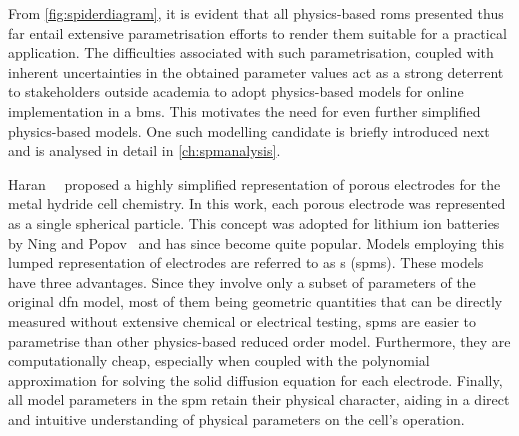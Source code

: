 From \cref{fig:spiderdiagram}, it is evident  that all physics-based \glspl{rom}
presented thus far entail extensive  parametrisation efforts   to  render
them  suitable for  a practical  application. The  difficulties associated  with
such  parametrisation,  coupled  with  inherent uncertainties  in  the  obtained
parameter values act  as a strong deterrent to stakeholders  outside academia to
adopt  physics-based  models for  online  implementation  in a  \gls{bms}.  This
motivates the  need for even  further simplified physics-based models.  One such
modelling  candidate  is briefly  introduced  next  and  is analysed  in  detail
in \cref{ch:spmanalysis}.


Haran~\etal{}~\cite{Haran1998}  proposed a  highly simplified  representation of
porous  electrodes for  the metal  hydride cell  chemistry. In  this work,  each
porous electrode  was represented as  a single spherical particle.  This concept
was adopted for lithium ion batteries  by Ning and Popov~\cite{Ning2004} and has
since  become quite  popular.  Models employing  this  lumped representation  of
electrodes are referred to as  s (\gls{spm}s). These models have
three advantages. Since they involve only a subset of parameters of the original
\gls{dfn} model,  most of them being  geometric quantities that can  be directly
measured  without  extensive chemical  or  electrical  testing, \glspl{spm}  are
easier to parametrise than other physics-based reduced order model. Furthermore,
they  are computationally  cheap, especially  when coupled  with the  polynomial
approximation  for solving  the  solid diffusion  equation  for each  electrode.
Finally, all model parameters in  the \gls{spm} retain their physical character,
aiding in  a direct and  intuitive understanding  of physical parameters  on the
cell's operation.

